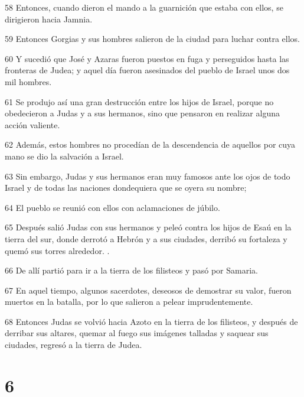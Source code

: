 \par 58 Entonces, cuando dieron el mando a la guarnición que estaba con ellos, se dirigieron hacia Jamnia.
\par 59 Entonces Gorgias y sus hombres salieron de la ciudad para luchar contra ellos.
\par 60 Y sucedió que José y Azaras fueron puestos en fuga y perseguidos hasta las fronteras de Judea; y aquel día fueron asesinados del pueblo de Israel unos dos mil hombres.
\par 61 Se produjo así una gran destrucción entre los hijos de Israel, porque no obedecieron a Judas y a sus hermanos, sino que pensaron en realizar alguna acción valiente.
\par 62 Además, estos hombres no procedían de la descendencia de aquellos por cuya mano se dio la salvación a Israel.
\par 63 Sin embargo, Judas y sus hermanos eran muy famosos ante los ojos de todo Israel y de todas las naciones dondequiera que se oyera su nombre;
\par 64 El pueblo se reunió con ellos con aclamaciones de júbilo.
\par 65 Después salió Judas con sus hermanos y peleó contra los hijos de Esaú en la tierra del sur, donde derrotó a Hebrón y a sus ciudades, derribó su fortaleza y quemó sus torres alrededor. .
\par 66 De allí partió para ir a la tierra de los filisteos y pasó por Samaria.
\par 67 En aquel tiempo, algunos sacerdotes, deseosos de demostrar su valor, fueron muertos en la batalla, por lo que salieron a pelear imprudentemente.
\par 68 Entonces Judas se volvió hacia Azoto en la tierra de los filisteos, y después de derribar sus altares, quemar al fuego sus imágenes talladas y saquear sus ciudades, regresó a la tierra de Judea.

\chapter{6}

